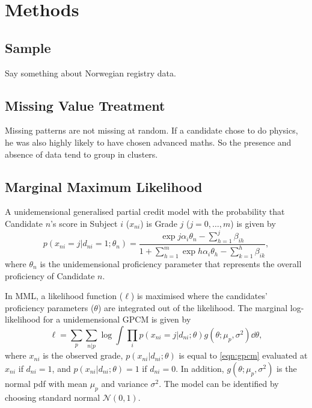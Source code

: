 \section{Methods}

\subsection{Sample}

Say something about Norwegian registry data.

\subsection{Missing Value Treatment}

Missing patterns are not missing at random. If a candidate chose to do physics, he was also highly likely to have chosen advanced maths. So the presence and absence of data tend to group in clusters.

\subsection{Marginal Maximum Likelihood}

A unidemensional generalised partial credit model \parencite{muraki:1992} with the probability that Candidate $n$'s score in Subject $i$ ($x_{ni}$) is Grade $j$ ($j=0, \dots, m$) is given by
\begin{equation}\label{eqn:gpcm}
    p(x_{ni}=j | d_{ni} = 1; \theta_n) = \frac{\exp{j \alpha_i \theta_n - \sum_{h=1}^j \beta_{ih}} }{ 1+ \sum_{h=1}^m \exp{h \alpha_i \theta_h - \sum_{k=1}^h \beta_{ik}} },
\end{equation}
where $\theta_n$ is the unidemensional proficiency parameter that represents the overall proficiency of Candidate $n$.

In MML, a likelihood function ($\ell$) is maximised where the candidates' proficiency parameters ($\theta$) are integrated out of the likelihood. The marginal log-likelihood for a unidemensional GPCM is given by
\begin{equation}\label{eqn:ll}
    \ell = \sum_p \sum_{n | p} \log \int \prod_i p( x_{ni} = j | d_{ni}; \theta ) g(\theta; \mu_p, \sigma^2) \dd \theta,
\end{equation}
where $x_{ni}$ is the observed grade, $p( x_{ni} | d_{ni}; \theta )$ is equal to \cref{eqn:gpcm} evaluated at $x_{ni}$ if $d_{ni}=1$, and $p(x_{ni} | d_{ni}; \theta) = 1$ if $d_{ni} = 0$. In addition, $g(\theta; \mu_p, \sigma^2)$ is the normal pdf with mean $\mu_p$ and variance $\sigma^2$. The model can be identified by choosing standard normal $\mathcal{N}(0,1)$.